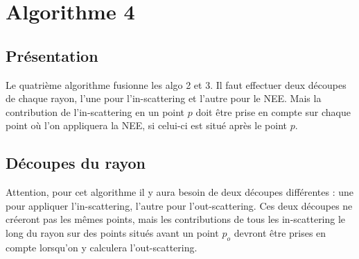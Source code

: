\chapter{Algorithme 4}

\section{Présentation}

Le quatrième algorithme fusionne les algo 2 et 3. Il faut effectuer deux découpes de chaque rayon, l'une pour l'in-scattering et l'autre pour le NEE. Mais la contribution de l'in-scattering en un point $p$ doit être prise en compte sur chaque point où l'on appliquera la NEE, si celui-ci est situé après le point $p$.

\section{Découpes du rayon}

Attention, pour cet algorithme il y aura besoin de deux découpes différentes : une pour appliquer l'in-scattering, l'autre pour l'out-scattering. Ces deux découpes ne créeront pas les mêmes points, mais les contributions de tous les in-scattering le long du rayon sur des points situés avant un point $p_o$ devront être prises en compte lorsqu'on y calculera l'out-scattering.